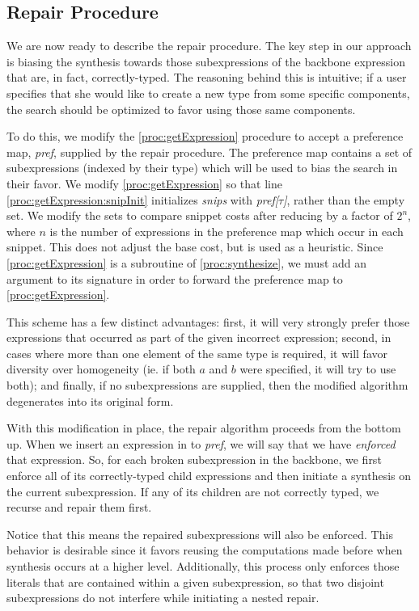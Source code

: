 \subsection{Repair Procedure}
We are now ready to describe the repair procedure. The key step in our approach is biasing the synthesis towards those subexpressions of the backbone expression that are, in fact, correctly-typed. The reasoning behind this is intuitive; if a user specifies that she would like to create a new type from some specific components, the search should be optimized to favor using those same components.

To do this, we modify the \ref{proc:getExpression} procedure to accept a preference map, \textit{pref}, supplied by the repair procedure. The preference map contains a set of subexpressions (indexed by their type) which will be used to bias the search in their favor. We modify \ref{proc:getExpression} so that line \ref{proc:getExpression:snipInit} initializes \textit{snips} with \textit{pref[$\tau$]}, rather than the empty set. We modify the sets to compare snippet costs after reducing by a factor of $2^{n}$, where $n$ is the number of expressions in the preference map which occur in each snippet. This does not adjust the base cost, but is used as a heuristic. Since \ref{proc:getExpression} is a subroutine of \ref{proc:synthesize}, we must add an argument to its signature in order to forward the preference map to \ref{proc:getExpression}.

This scheme has a few distinct advantages: first, it will very strongly prefer those expressions that occurred as part of the given incorrect expression; second, in cases where more than one element of the same type is required, it will favor diversity over homogeneity (ie. if both $a$ and $b$ were specified, it will try to use both); and finally, if no subexpressions are supplied, then the modified algorithm degenerates into its original form.

With this modification in place, the repair algorithm proceeds from the bottom up. When we insert an expression  in to \textit{pref}, we will say that we have \textit{enforced} that expression. So, for each broken subexpression in the backbone, we first enforce all of its correctly-typed child expressions and then initiate a synthesis on the current subexpression. If any of its children are not correctly typed, we recurse and repair them first.

Notice that this means the repaired subexpressions will also be enforced. This behavior is desirable since it favors reusing the computations made before when synthesis occurs at a higher level. Additionally, this process  only enforces those literals that are contained within a given subexpression, so that two disjoint subexpressions do not interfere while initiating a nested repair.

